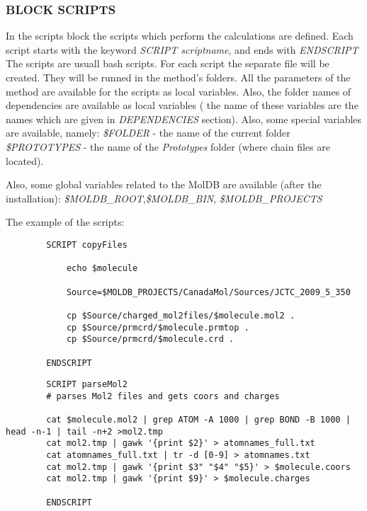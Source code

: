 \documentclass[12pt]{article}
\begin{document}
\subsubsection{BLOCK SCRIPTS}

In the scripts block  the scripts which perform the calculations are defined.
Each script starts with the keyword \emph{SCRIPT scriptname}, and ends with \emph{ENDSCRIPT}
The scripts are usuall bash scripts.
For each script the separate file will be created.
They will be runned in the method's folders.
All the parameters of the method are available for the scripts as local variables.
Also, the folder names of dependencies are available as local variables ( the name of these variables are the names which are given in \emph{DEPENDENCIES} section).
Also, some special variables are available, namely:
\emph{\$FOLDER} - the name of the current folder
\emph{\$PROTOTYPES} - the name of the \emph{Prototypes} folder (where chain files are located).

Also, some global variables related to the MolDB are available (after the installation):
\emph{\$MOLDB\_ROOT},\emph{\$MOLDB\_BIN}, \emph{\$MOLDB\_PROJECTS}

The example of the scripts:
\begin{verbatim}
		SCRIPT copyFiles
			
			echo $molecule

			Source=$MOLDB_PROJECTS/CanadaMol/Sources/JCTC_2009_5_350

			cp $Source/charged_mol2files/$molecule.mol2 .
			cp $Source/prmcrd/$molecule.prmtop .
			cp $Source/prmcrd/$molecule.crd .

		ENDSCRIPT	
\end{verbatim}



\begin{verbatim}
		SCRIPT parseMol2
		# parses Mol2 files and gets coors and charges 

		cat $molecule.mol2 | grep ATOM -A 1000 | grep BOND -B 1000 | head -n-1 | tail -n+2 >mol2.tmp
		cat mol2.tmp | gawk '{print $2}' > atomnames_full.txt
		cat atomnames_full.txt | tr -d [0-9] > atomnames.txt
		cat mol2.tmp | gawk '{print $3" "$4" "$5}' > $molecule.coors
		cat mol2.tmp | gawk '{print $9}' > $molecule.charges
		
		ENDSCRIPT
\end{verbatim}
\end{document}
